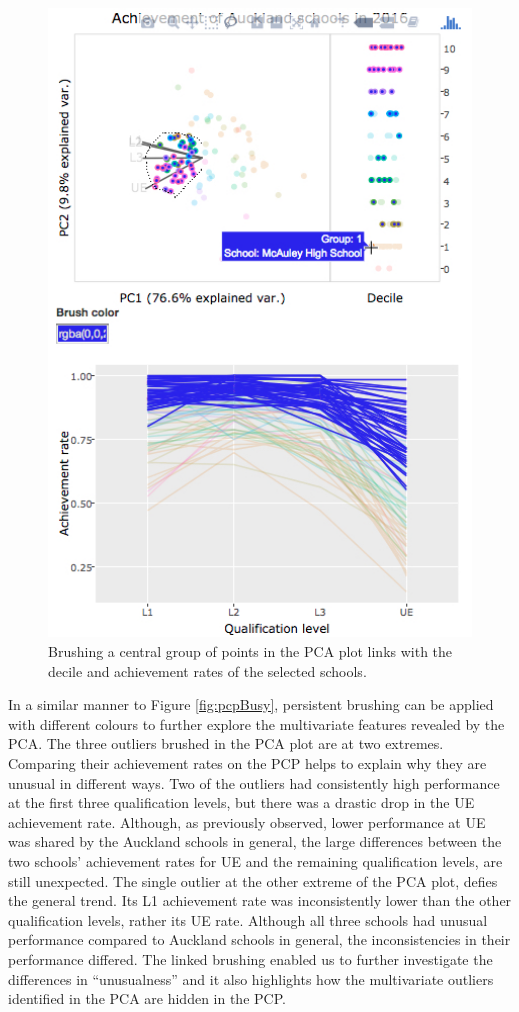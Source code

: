 \documentclass[]{book}
\theoremstyle{definition}
\theoremstyle{definition}
\theoremstyle{definition}
\theoremstyle{remark}
\begin{document}
\begin{figure}[center]
\includegraphics[width=500px]{files/link_group} \caption{Brushing a central group of points in the PCA plot links with the decile and achievement rates of the selected schools.}\label{fig:brushGroup}
\end{figure}

In a similar manner to Figure \ref{fig:pcpBusy}, persistent brushing can
be applied with different colours to further explore the multivariate
features revealed by the PCA. The three outliers brushed in the PCA plot
are at two extremes. Comparing their achievement rates on the PCP helps
to explain why they are unusual in different ways. Two of the outliers
had consistently high performance at the first three qualification
levels, but there was a drastic drop in the UE achievement rate.
Although, as previously observed, lower performance at UE was shared by
the Auckland schools in general, the large differences between the two
schools' achievement rates for UE and the remaining qualification
levels, are still unexpected. The single outlier at the other extreme of
the PCA plot, defies the general trend. Its L1 achievement rate was
inconsistently lower than the other qualification levels, rather its UE
rate. Although all three schools had unusual performance compared to
Auckland schools in general, the inconsistencies in their performance
differed. The linked brushing enabled us to further investigate the
differences in ``unusualness'' and it also highlights how the
multivariate outliers identified in the PCA are hidden in the PCP.
\end{document}

